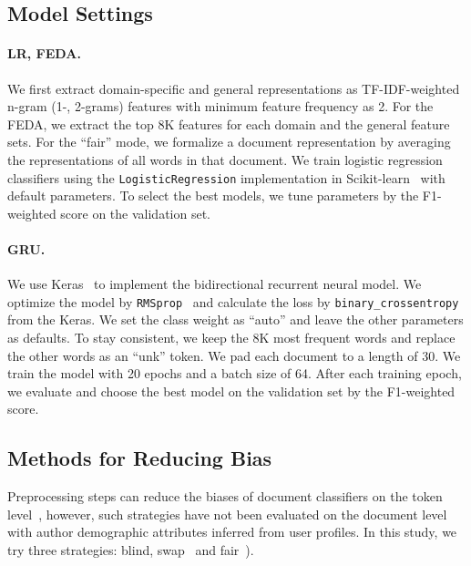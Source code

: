 \subsection{Model Settings}

\paragraph{LR, FEDA.} We first extract domain-specific and general representations as TF-IDF-weighted n-gram (1-, 2-grams) features with minimum feature frequency as 2. For the FEDA, we extract the top 8K features for each domain and the general feature sets.
For the ``fair'' mode, we formalize a document representation by averaging the representations of all words in that document.
We train logistic regression classifiers using the \texttt{LogisticRegression} implementation in Scikit-learn~\cite{pedregosa2011scikit} with default parameters.
To select the best models, we tune parameters by the F1-weighted score on the validation set.

\paragraph{GRU.} We use Keras~\cite{chollet2015keras} to implement the bidirectional recurrent neural model. 
We optimize the model by \texttt{RMSprop}~\cite{tieleman2012lecture} and calculate the loss by \texttt{binary\_crossentropy} from the Keras.
We set the class weight as ``auto'' and leave the other parameters as defaults.
To stay consistent, we keep the 8K most frequent words and replace the other words as an ``unk'' token.
We pad each document to a length of 30.
We train the model with 20 epochs and a batch size of 64. 
After each training epoch, we evaluate and choose the best model on the validation set by the F1-weighted score.


\subsection{Methods for Reducing Bias}

Preprocessing steps can reduce the biases of document classifiers on the token level~\cite{dixon2018measuring, park2018reducing, garg2019counterfactual}, however, such strategies have not been evaluated on the document level with author demographic attributes inferred from user profiles.
In this study, we try three strategies: blind, swap~\cite{park2018reducing, garg2019counterfactual} and fair~\cite{park2018reducing}). 

